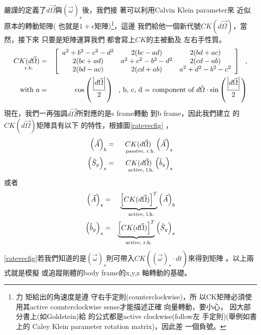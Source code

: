 \documentclass[12pt,a4paper]{article}
\begin{document}
嚴謹的定義了$d\vec{\Omega}$與$%
\left( \vec{\omega}\right) _{s}$後，我們接%
著可以利用Calvin Klein parameter來%
近似原本的轉動矩陣(%
也就是$1+\epsilon $矩陣)\footnote{力%
矩給出的角速度是遵%
守右手定則(counterclockwise)，所%
以CK矩陣必須使用其active
counterclockwise sense才能描述正確%
向量轉動，要小心，%
因大部分書上(如Goldstein)給%
的公式都是active clockwise(follow左%
手定則)(舉例如書上的%
Caley Klein parameter rotation matrix)，因此差%
一個負號。\bigskip}，這邊%
我們給他一個新代號$CK(d%
\vec{\Omega})$，當然，接下來%
只要是矩陣運算我們%
都會寫上$CK$的主被動及%
左右手性質。%
\begin{eqnarray*}
\underset{\text{r.h.}}{CK(d\vec{\Omega})} &=&\left[ 
\begin{array}{ccc}
a^{2}+b^{2}-c^{2}-d^{2} & 2(bc-ad) & 2(bd+ac) \\ 
2(bc+ad) & a^{2}+c^{2}-b^{2}-d^{2} & 2(cd-ab) \\ 
2(bd-ac) & 2(cd+ab) & a^{2}+d^{2}-b^{2}-c^{2}%
\end{array}%
\right] \text{,} \\
\text{with }a &=&\cos \left( \frac{\left\vert d\vec{\Omega}\right\vert }{2}%
\right) \text{, b, c, d = component of }d\hat{\Omega}\cdot \sin \left( \frac{%
\left\vert d\vec{\Omega}\right\vert }{2}\right)
\end{eqnarray*}%
現在，我們一再強調$d%
\vec{\Omega}$所對應的是s frame轉動%
到b frame，因此我們建立%
的$CK(d\vec{\Omega})$矩陣具有以下%
的特性，根據圖\ref{ratevecfig}%
，%
\begin{eqnarray*}
\left( \vec{A}\right) _{b} &=&\underset{\text{passive, r.h.}}{CK(d\vec{\Omega%
})}\left( \vec{A}\right) _{s} \\
\left( \hat{S}_{y}\right) _{s} &=&\underset{\text{active, l.h.}}{CK(d\vec{%
\Omega})}\left( \hat{b}_{y}\right) _{s}
\end{eqnarray*}%
或者%
\begin{eqnarray}
\left( \vec{A}\right) _{s} &=&\underset{\text{active, l.h.}}{\underbrace{%
\left[ CK(d\vec{\Omega})\right] ^{T}}}\left( \vec{A}\right) _{b}
\label{frametrans} \\
\left( \hat{b}_{y}\right) _{s} &=&\underset{\text{active, r.h.}}{\underbrace{%
\left[ CK(d\vec{\Omega})\right] ^{T}}}\left( \hat{S}_{y}\right) _{s}
\label{vecrot}
\end{eqnarray}%
\ref{ratevecfig}若我們知道的是$%
\left( \vec{\omega}\right) _{s}$則可帶入$CK(\left( 
\vec{\omega}\right) _{s}\cdot dt)$來得到矩陣%
。以上兩式就是模擬%
或追蹤剛體的body frame的x,y,z%
軸轉動的基礎。
\end{document}
